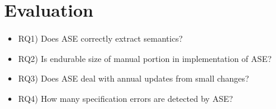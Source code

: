 \section{Evaluation}

\begin{itemize}
  \item RQ1) Does ASE correctly extract semantics?
  \item RQ2) Is endurable size of manual portion in implementation of ASE?
  \item RQ3) Does ASE deal with annual updates from small changes?
  \item RQ4) How many specification errors are detected by ASE?
\end{itemize}

